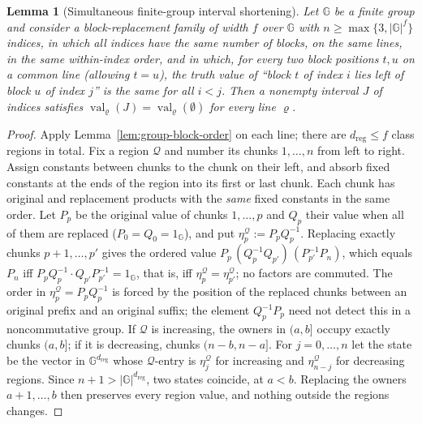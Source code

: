 \documentclass[11pt]{article}
\numberwithin{equation}{section}
\theoremstyle{plain}
\newtheorem{lemma}[theorem]{Lemma}
\theoremstyle{definition}
\theoremstyle{remark}
\theoremstyle{plain}
\begin{document}
\begin{lemma}[Simultaneous finite-group interval shortening]
\label{lem:group-interval}
Let ${\mathbb G}$ be a finite group and consider a block-replacement family of width $f$
over ${\mathbb G}$ with $n\ge\max\{3,|{\mathbb G}|^f\}$ indices, in which all indices have the same
number of blocks, on the same lines, in the same within-index order, and in which,
for every two block positions $t,u$ on a common line (allowing $t=u$), the truth value of
``block $t$ of index $i$ lies left of block $u$ of index $j$'' is the same for all
$i<j$.  Then a nonempty interval $J$ of indices satisfies
$\operatorname{val}_\varrho(J)=\operatorname{val}_\varrho(\emptyset)$ for every line $\varrho$.
\end{lemma}

\begin{proof}
Apply Lemma~\ref{lem:group-block-order} on each line; there are
$d_{\mathrm{reg}}\le f$ class regions in total.  Fix a region $\mathcal Q$ and number its chunks $1,\ldots,n$ from
left to right.  Assign constants between chunks to the chunk on their left,
and absorb fixed constants at the ends of the region into its first or last
chunk.  Each chunk has original and replacement products with the \emph{same}
fixed constants in the same order.  Let $P_p$ be the original value of chunks $1,\ldots,p$ and $Q_p$ their value
when all of them are replaced ($P_0=Q_0=1_{\mathbb G}$), and put
$\eta^{\mathcal Q}_p:=P_pQ_p^{-1}$.  Replacing exactly chunks $p+1,\ldots,p'$ gives
the ordered value $P_p\,(Q_p^{-1}Q_{p'})\,(P_{p'}^{-1}P_n)$, which equals $P_n$
iff $P_pQ_p^{-1}\cdot Q_{p'}P_{p'}^{-1}=1_{\mathbb G}$, that is, iff
$\eta^{\mathcal Q}_p=\eta^{\mathcal Q}_{p'}$; no factors are commuted.  The
order in $\eta^{\mathcal Q}_p=P_pQ_p^{-1}$ is forced by the position of the
replaced chunks between an original prefix and an original suffix; the
element $Q_p^{-1}P_p$ need not detect this in a noncommutative group.  If
$\mathcal Q$ is increasing, the owners in $(a,b]$ occupy exactly chunks $(a,b]$; if it
is decreasing, chunks $(n-b,n-a]$.  For $j=0,\ldots,n$ let the state be the vector in
${\mathbb G}^{d_{\mathrm{reg}}}$ whose $\mathcal Q$-entry is $\eta^{\mathcal Q}_j$ for increasing and
$\eta^{\mathcal Q}_{n-j}$ for decreasing regions.  Since $n+1>|{\mathbb G}|^{d_{\mathrm{reg}}}$, two states
coincide, at $a<b$.  Replacing the owners $a+1,\ldots,b$ then preserves every region
value, and nothing outside the regions changes.
\end{proof}
\end{document}

